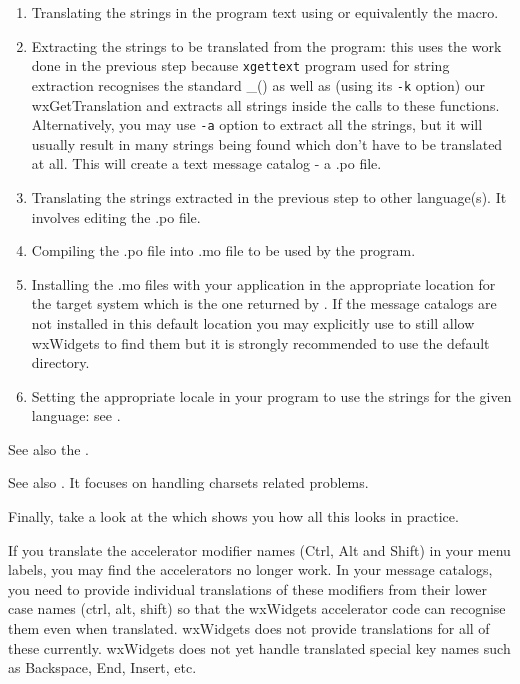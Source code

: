 \begin{enumerate}\itemsep=0pt
\item Translating the strings in the program text using 
 or equivalently the 
 macro.
\item Extracting the strings to be translated from the program: this uses the
work done in the previous step because {\tt xgettext} program used for string
extraction recognises the standard \_() as well as (using its {\tt -k} option)
our wxGetTranslation and extracts all strings inside the calls to these
functions. Alternatively, you may use {\tt -a} option to extract all the
strings, but it will usually result in many strings being found which don't
have to be translated at all. This will create a text message catalog - a .po
file.
\item Translating the strings extracted in the previous step to other
language(s). It involves editing the .po file.
\item Compiling the .po file into .mo file to be used by the program.
\item Installing the .mo files with your application in the appropriate
location for the target system which is the one returned by 
.
If the message catalogs are not installed in this default location you may
explicitly use  to
still allow wxWidgets to find them but it is strongly recommended to use the
default directory.
\item Setting the appropriate locale in your program to use the strings for the
given language: see .
\end{enumerate}

See also the .

See also .
It focuses on handling charsets related problems.

Finally, take a look at the  which shows
you how all this looks in practice.


If you translate the accelerator modifier names (Ctrl, Alt and Shift) in your menu labels, you may find
the accelerators no longer work. In your message catalogs, you need to provide individual translations
of these modifiers from their lower case names (ctrl, alt, shift) so that the wxWidgets accelerator
code can recognise them even when translated. wxWidgets does not provide translations for all of these
currently. wxWidgets does not yet handle translated special key names such as Backspace,
End, Insert, etc.

